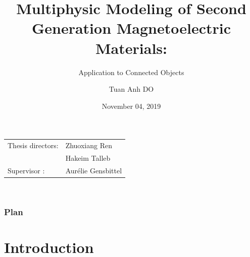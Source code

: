 \documentclass[compress]{beamer}
\author{Tuan Anh DO}
\title{\large Multiphysic Modeling of Second Generation Magnetoelectric Materials:}
\subtitle{Application to Connected Objects}
\institute{{\color{blue} \textbf{\large PhD Thesis Defense}}}
\date{{\color{letterfoot} November 04, 2019}}
\begin{document}
 
\begin{frame}[plain]
\maketitle
\small
\vspace*{0.5cm}
\centering
\begin{tabular}[t]{ll}
Thesis directors: & Zhuoxiang Ren \\ [0.2cm]
& Hakeim Talleb \\ [0.2cm]
Supervisor : & Aurélie Gensbittel \\
\end{tabular} \\
\end{frame}

\begin{frame}\frametitle{Plan}
\tableofcontents
\end{frame}


\section{Introduction}
\end{document}
